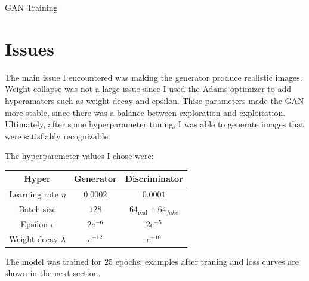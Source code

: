 \documentclass{genai}
\begin{document}
\begin{algorithm}[h]
    \caption{GAN Training}
    \begin{algorithmic}[1]
        \EndProcedure
		\EndProcedure
				\EndFor
			\EndFor
		\EndProcedure
    \end{algorithmic}
\end{algorithm}

\section{Issues}

The main issue I encountered was making the generator produce realistic images.
Weight collapse was not a large issue since I used the Adams optimizer to add hyperamaters such as weight decay and epsilon.
Thise parameters made the GAN more stable, since there was a balance between exploration and exploitation.
Ultimately, after some hyperparameter tuning, I was able to generate images that were satisfiably recognizable.

The hyperparemeter values I chose were:
\begin{center}
	\begin{tabular}{c|c|c}
		\textbf{Hyper} & \textbf{Generator} & \textbf{Discriminator} \\
		\hline
		Learning rate $\eta$ & $0.0002$ & $0.0001$\\
		Batch size & $128$ & $64_\text{real}+64_{fake}$\\
		Epsilon $\epsilon$ & $2e^{-6}$ & $2e^{-5}$\\
		Weight decay $\lambda$ & $e^{-12}$ & $e^{-10}$
	\end{tabular}
\end{center}
The model was trained for 25 epochs; examples after traning and loss curves are shown in the next section.
\end{document}
